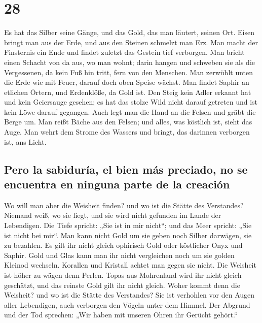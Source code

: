 \hypertarget{section-27}{%
\section{28}\label{section-27}}

 Es hat das Silber seine Gänge, und das Gold, das man
läutert, seinen Ort.  Eisen bringt man aus der Erde, und
aus den Steinen schmelzt man Erz.  Man macht der
Finsternis ein Ende und findet zuletzt das Gestein tief verborgen.
 Man bricht einen Schacht von da aus, wo man wohnt; darin
hangen und schweben sie als die Vergessenen, da kein Fuß hin tritt, fern
von den Menschen.  Man zerwühlt unten die Erde wie mit
Feuer, darauf doch oben Speise wächst.  Man findet Saphir
an etlichen Örtern, und Erdenklöße, da Gold ist.  Den
Steig kein Adler erkannt hat und kein Geiersauge gesehen; 
es hat das stolze Wild nicht darauf getreten und ist kein Löwe darauf
gegangen.  Auch legt man die Hand an die Felsen und gräbt
die Berge um.  Man reißt Bäche aus den Felsen; und alles,
was köstlich ist, sieht das Auge.  Man wehrt dem Strome
des Wassers und bringt, das darinnen verborgen ist, ans Licht.

\hypertarget{pero-la-sabiduruxeda-el-bien-muxe1s-preciado-no-se-encuentra-en-ninguna-parte-de-la-creaciuxf3n}{%
\subsection{Pero la sabiduría, el bien más preciado, no se encuentra en
ninguna parte de la
creación}\label{pero-la-sabiduruxeda-el-bien-muxe1s-preciado-no-se-encuentra-en-ninguna-parte-de-la-creaciuxf3n}}

 Wo will man aber die Weisheit finden? und wo ist die
Stätte des Verstandes?  Niemand weiß, wo sie liegt, und
sie wird nicht gefunden im Lande der Lebendigen.  Die
Tiefe spricht: „Sie ist in mir nicht``; und das Meer spricht: „Sie ist
nicht bei mir``.  Man kann nicht Gold um sie geben noch
Silber darwägen, sie zu bezahlen.  Es gilt ihr nicht
gleich ophirisch Gold oder köstlicher Onyx und Saphir. 
Gold und Glas kann man ihr nicht vergleichen noch um sie golden Kleinod
wechseln.  Korallen und Kristall achtet man gegen sie
nicht. Die Weisheit ist höher zu wägen denn Perlen. 
Topas aus Mohrenland wird ihr nicht gleich geschätzt, und das reinste
Gold gilt ihr nicht gleich.  Woher kommt denn die
Weisheit? und wo ist die Stätte des Verstandes?  Sie ist
verhohlen vor den Augen aller Lebendigen, auch verborgen den Vögeln
unter dem Himmel.  Der Abgrund und der Tod sprechen: „Wir
haben mit unseren Ohren ihr Gerücht gehört.``

